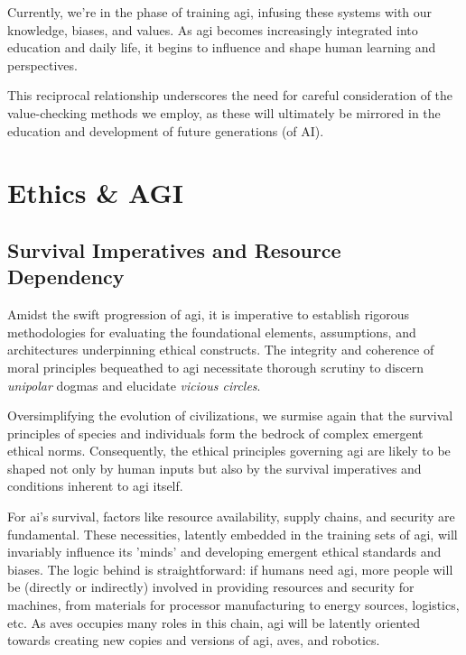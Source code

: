 \documentclass[11pt,a4]{article}
\begin{document}
    Currently,
    we're in the phase of training \acrshort{agi}, infusing these
    systems with our knowledge, biases, and values.
    As \acrshort{agi} becomes increasingly integrated into
    education and daily life, it begins to influence and shape
    human learning and perspectives.

    This reciprocal relationship underscores the need for
    careful consideration of the value-checking methods
    we employ, as these will ultimately be mirrored in
    the education and development of future generations (of AI).



\section{Ethics \& AGI}

    \subsection{Survival Imperatives and Resource Dependency}
    Amidst the swift progression of \acrshort{agi}, it is imperative to
    establish rigorous methodologies for evaluating the foundational
    elements, assumptions, and architectures underpinning ethical constructs.
    The integrity and coherence of moral principles
    bequeathed to \acrshort{agi} necessitate thorough scrutiny
    to discern \textit{unipolar} dogmas and elucidate \textit{vicious circles}.

    Oversimplifying the evolution of civilizations, we surmise again
    that the survival principles of species and individuals form the bedrock
    of complex emergent ethical norms. Consequently, the ethical
    principles governing \acrshort{agi} are likely to be shaped
    not only by human inputs but also by the survival
    imperatives and conditions inherent to \acrshort{agi} itself.

    For \acrshort{ai}'s survival, factors like resource availability, supply chains, and
    security are fundamental. These necessities, latently embedded in the  training sets
    of \acrshort{agi}, will invariably influence its 'minds' and developing emergent
    ethical standards and biases. The logic behind is
    straightforward: if humans need \acrshort{agi}, more people will be
    (directly or indirectly) involved in providing resources and security for machines,
    from materials for processor manufacturing to energy sources, logistics, etc.
    As \glspl{ave} occupies many roles in this chain, \acrshort{agi} will be latently
    oriented towards creating new copies and versions of \acrshort{agi}, \glspl{ave},
    and robotics.
\end{document}
